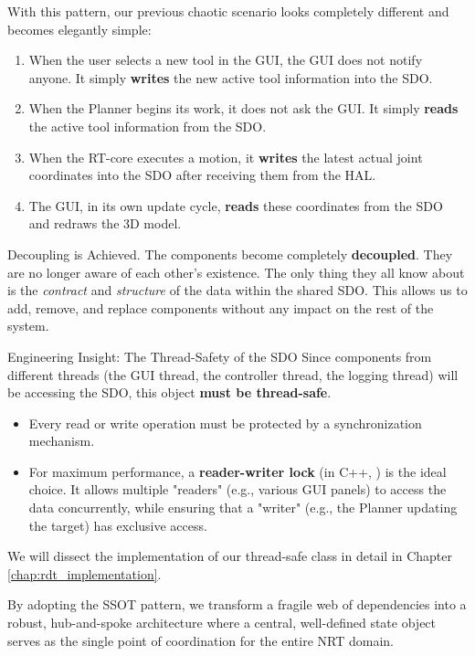 With this pattern, our previous chaotic scenario looks completely different and becomes elegantly simple:
\begin{enumerate}
    \item When the user selects a new tool in the GUI, the GUI does not notify anyone. It simply \textbf{writes} the new active tool information into the SDO.
    \item When the Planner begins its work, it does not ask the GUI. It simply \textbf{reads} the active tool information from the SDO.
    \item When the RT-core executes a motion, it \textbf{writes} the latest actual joint coordinates into the SDO after receiving them from the HAL.
    \item The GUI, in its own update cycle, \textbf{reads} these coordinates from the SDO and redraws the 3D model.
\end{enumerate}

\begin{principlebox}{Decoupling is Achieved.}
The components become completely \textbf{decoupled}. They are no longer aware of each other's existence. The only thing they all know about is the \textit{contract} and \textit{structure} of the data within the shared SDO. This allows us to add, remove, and replace components without any impact on the rest of the system.
\end{principlebox}

\begin{tipbox}{Engineering Insight: The Thread-Safety of the SDO}
    Since components from different threads (the GUI thread, the controller thread, the logging thread) will be accessing the SDO, this object \textbf{must be thread-safe}.
    \begin{itemize}
        \item Every read or write operation must be protected by a synchronization mechanism.
        \item For maximum performance, a \textbf{reader-writer lock} (in C++, ) is the ideal choice. It allows multiple "readers" (e.g., various GUI panels) to access the data concurrently, while ensuring that a "writer" (e.g., the Planner updating the target) has exclusive access.
    \end{itemize}
    We will dissect the implementation of our thread-safe  class in detail in Chapter \ref{chap:rdt_implementation}.
\end{tipbox}

By adopting the SSOT pattern, we transform a fragile web of dependencies into a robust, hub-and-spoke architecture where a central, well-defined state object serves as the single point of coordination for the entire NRT domain.



